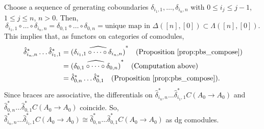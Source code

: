 \begin{eg} 
\label{eg:pb3}
Choose a sequence of generating coboundaries 
$\delta_{i_1,1}, \dots, \delta_{i_n,n}$ with 
$0 \leq i_j \leq j-1$, $1 \leq j \leq n$, 
$n>0$. 
Then,
$$
\delta_{i_1,1} \circ \dots \circ \delta_{i_n,n} 
= \delta_{0,1} \circ \dots \circ \delta_{0,n}
= \textrm{unique map in } \Delta([n],[0])
  \subset \Lambda([n],[0]).
$$
This implies that, as functors 
on categories of comodules, 
\begin{align*}
\hat{\delta}_{i_n,n}^* \dots \hat{\delta}_{i_1,1}^*
&=
\widehat{(\delta_{i_1,1} \circ \dots \circ 
  \delta_{i_n,n})}^*
  \quad \textrm{(Proposition \ref{prop:pbs_compose})}\\
&= 
\widehat{(\delta_{0,1} \circ \dots \circ 
  \delta_{0,n})}^*
  \quad \textrm{(Computation above)}\\
&= 
\hat{\delta}_{0,n}^* \dots \hat{\delta}_{0,1}^* 
  \quad \textrm{(Proposition \ref{prop:pbs_compose}).} 
\end{align*}
Since braces are associative, the 
differentials on $\hat{\delta}_{i_n,n}^* 
\dots \hat{\delta}_{i_1,1}^*C(A_0 \to A_0)$ and 
$\hat{\delta}_{0,n}^* 
\dots \hat{\delta}_{0,1}^*C(A_0 \to A_0)$ 
coincide. So, $\hat{\delta}_{i_n,n}^* 
\dots \hat{\delta}_{i_1,1}^*C(A_0 \to A_0)
\cong \hat{\delta}_{0,n}^* 
\dots \hat{\delta}_{0,1}^*C(A_0 \to A_0)$ 
as dg comodules.
\end{eg}
%
